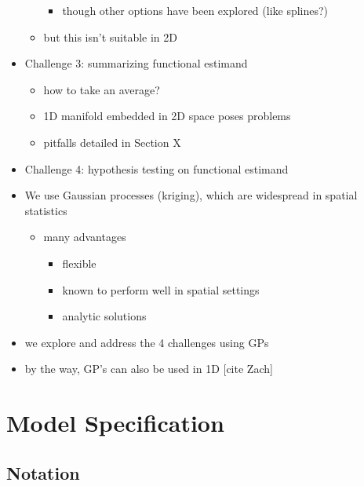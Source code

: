 \documentclass[letter]{article}
\providecommand{\tightlist}{%
      \setlength{\itemsep}{0pt}\setlength{\parskip}{0pt}}
\providecommand{\tightlist}{%
  	  \setlength{\itemsep}{0pt}\setlength{\parskip}{0pt}}
\begin{document}
\begin{itemize}
\begin{itemize}
    \begin{itemize}
    \tightlist
    \item
      though other options have been explored (like splines?)
    \end{itemize}
  \item
    but this isn't suitable in 2D
  \end{itemize}
\item
  Challenge 3: summarizing functional estimand

  \begin{itemize}
  \tightlist
  \item
    how to take an average?
  \item
    1D manifold embedded in 2D space poses problems
  \item
    pitfalls detailed in Section X
  \end{itemize}
\item
  Challenge 4: hypothesis testing on functional estimand
\item
  We use Gaussian processes (kriging), which are widespread in spatial
  statistics

  \begin{itemize}
  \tightlist
  \item
    many advantages

    \begin{itemize}
    \tightlist
    \item
      flexible
    \item
      known to perform well in spatial settings
    \item
      analytic solutions
    \end{itemize}
  \end{itemize}
\item
  we explore and address the 4 challenges using GPs
\item
  by the way, GP's can also be used in 1D {[}cite Zach{]}
\end{itemize}
    


    	\section{Model Specification}\label{model-specification}

\subsection{Notation}\label{notation}
\end{document}
